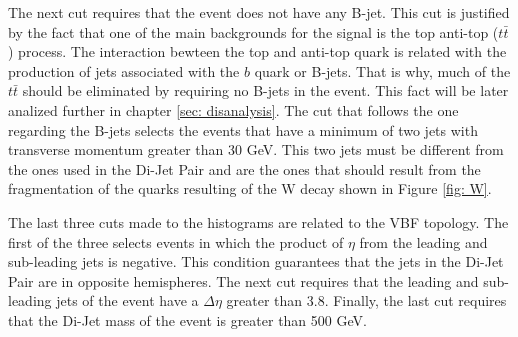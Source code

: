 The next cut requires that the event does not have any B-jet. This cut is justified by the fact that one of the main backgrounds for the signal is the top anti-top ($t\bar{t}$) process. The interaction bewteen the top and anti-top quark is related with the production of jets associated with the $b$ quark or B-jets. That is why, much of the $t\bar{t}$ should be eliminated by requiring no B-jets in the event. This fact will be later analized further in chapter \ref{sec: disanalysis}. The cut that follows the one regarding the B-jets selects the events that have a minimum of two jets with transverse momentum greater than 30 GeV. This two jets must be different from the ones used in the Di-Jet Pair and are the ones that should result from the fragmentation of the quarks resulting of the W decay shown in Figure \ref{fig: W}.

The last three cuts made to the histograms are related to the VBF topology. The first of the three selects events in which the product of $\eta$ from the leading and sub-leading jets is negative. This condition guarantees that the jets in the Di-Jet Pair are in opposite hemispheres. The next cut requires that the leading and sub-leading jets of the event have a $\Delta \eta$ greater than 3.8. Finally, the last cut requires that the Di-Jet mass of the event is greater than 500 GeV.





